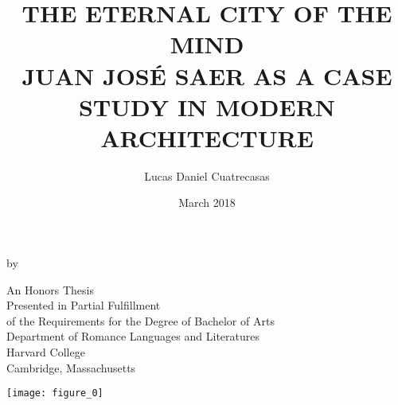 \documentclass[11pt]{report}
\title{THE ETERNAL CITY OF THE MIND \\ JUAN JOSÉ SAER AS A CASE STUDY IN MODERN ARCHITECTURE}
\author{Lucas Daniel Cuatrecasas}
\date{March 2018}
\begin{document}

\begin{titlepage}

\begin{center}

\makeatletter

\vspace*{25pt}

\LARGE{\@title}

\vspace{12pt}

\normalsize by

\vspace{12pt}

\Large{\@author}

\vspace{40pt}

\normalsize An Honors Thesis \\ \vspace{40pt} Presented in Partial Fulfillment \\ of the Requirements for the Degree of Bachelor of Arts \\ Department of Romance Languages and Literatures \\ \vspace{40pt} Harvard College \\ Cambridge, Massachusetts


\vspace{40pt}

\texttt{[image: figure\_0]}

\vspace{35pt}

\@date

\makeatother

\end{center}

\end{titlepage}

\end{document}

